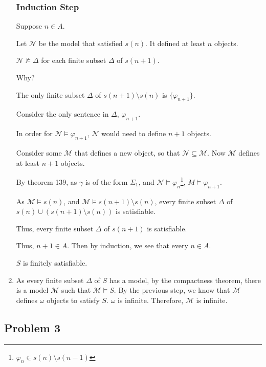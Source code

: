 \documentclass[a4paper]{article}
\newcommand{\SET}[1]{\{ {#1} \}}
\begin{document}
\begin{enumerate}
    \subsubsection*{Induction Step} 

    Suppose $n \in A$. 
    
    Let $\mathcal{N}$ be the model that satisfied $s(n)$. It defined at least $n$ objects. 

    $\mathcal{N} \not\models \Delta$ for each finite subset $\Delta$ of $s(n + 1)$.

    Why?

    The only finite subset $\Delta$ of $s(n + 1) \setminus s(n)$ is $\SET{\varphi_{n + 1}}$.

    Consider the only sentence in $\Delta$, $\varphi_{n + 1}$. 

    In order for $\mathcal{N} \models \varphi_{n + 1}$, $\mathcal{N}$ would need to define $n + 1$ objects.

    Consider some $\mathcal{M}$ that defines a new object, so that $\mathcal{N} \subseteq \mathcal{M}$. Now $\mathcal{M}$ defines at least $n + 1$ objects. 

    By theorem 139, as $\gamma$ is of the form $\Sigma_1$, and $\mathcal{N} \models \varphi_n$\footnote{$\varphi_n \in s(n) \setminus s(n -1)$}, $M \models \varphi_{n + 1}$.
    
    As $\mathcal{M} \models s(n)$, and $\mathcal{M} \models s(n + 1) \setminus s(n)$, every finite subset $\Delta$ of $s(n) \cup (s(n + 1) \setminus s(n))$ is satisfiable.

    Thus, every finite subset $\Delta$ of $s(n + 1)$ is satisfiable. 

    Thus, $n + 1 \in A$. Then by induction, we see that every $n \in A$.

    $S$ is finitely satisfiable.

    \item As every finite subset $\Delta$ of $S$ has a model, by the compactness theorem, there is a model $\mathcal{M}$ such that $\mathcal{M} \models S$. By the previous step, we know that $\mathcal{M}$ defines $\omega$ objects to satisfy $S$. $\omega$ is infinite. Therefore, $\mathcal{M}$ is infinite.

\end{enumerate}

\newpage
\subsection*{Problem 3}
\end{document}
